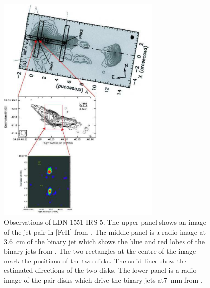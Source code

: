 \begin{figure}[t]
\centering
\includegraphics[width=8cm]{FiendishlyGood}
\caption{
Observations of LDN 1551 IRS 5.
The upper panel shows an image of the jet pair in [FeII] from \citet{2002ApJ...570..724P}.
The middle panel is a radio image at $3.6$~cm of the binary jet which shows the blue and red lobes of the binary jets from \citet{1998Natur.395..355R}. The two rectangles at the centre of the image mark the positions of the two disks. The solid lines show the estimated directions of the two disks.
The lower panel is a radio image of the pair disks which drive the binary jets at$7$~mm from \citet{1998Natur.395..355R}.
}
\label{fig:Fiend} 
\end{figure}



